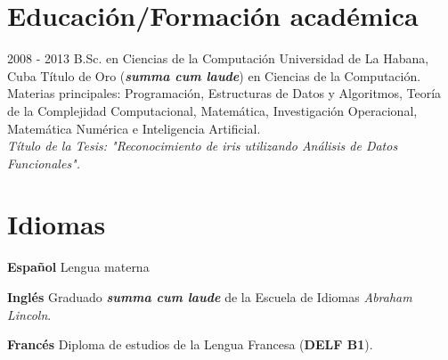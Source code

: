 \documentclass[]{friggeri-cv}
\begin{document}
\pagebreak

\section{Educación/Formación académica}
\begin{entrylist}

  \entry
    {2008 - 2013}
    {B.Sc. en Ciencias de la Computación}
    {Universidad de La Habana, Cuba}
    {Título de Oro (\textbf{\emph{summa cum laude}}) en Ciencias de la Computación. Materias principales: Programación, Estructuras de Datos y Algoritmos, Teoría de la Complejidad Computacional, Matemática, Investigación Operacional, Matemática Numérica e Inteligencia Artificial.\\
    \emph{Título de la Tesis: "Reconocimiento de iris utilizando Análisis de Datos Funcionales".}}

\end{entrylist}

\section{Idiomas}
\begin{entrylist}
  \entry
    {\textbf{Español}}
    {}
    {}
    {Lengua materna}      

  \entry
    {\textbf{Inglés}}
    {}
    {}
    {Graduado \textbf{\emph{summa cum laude}} de la Escuela de Idiomas \emph{Abraham Lincoln}.}

  \entry
    {\textbf{Francés}}
    {}
    {}
    {Diploma de estudios de la Lengua Francesa (\textbf{DELF B1}).}
\end{entrylist}
\end{document}
